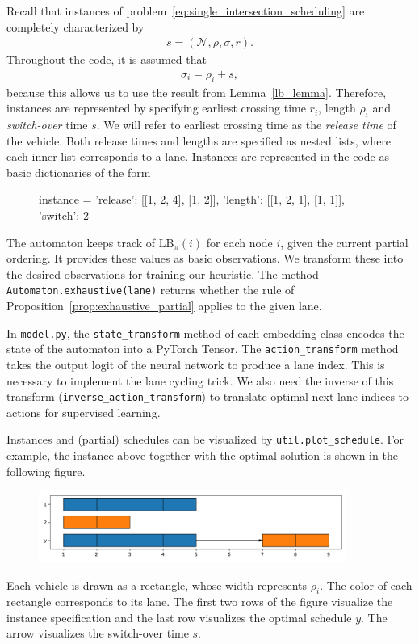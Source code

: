 \documentclass[a4paper]{article}
\theoremstyle{definition}
\theoremstyle{plain}
\begin{document}
\vspace{1em}
Recall that instances of
problem~\eqref{eq:single_intersection_scheduling} are completely characterized
by
\begin{align*}
  s = (\mathcal{N}, \rho, \sigma, r) .
\end{align*}
Throughout the code, it is assumed that
\begin{align*}
  \sigma_{i} = \rho_{i} + s ,
\end{align*}
because this allows us to use the result from Lemma~\ref{lb_lemma}.
Therefore, instances are represented by specifying earliest crossing time
$r_{i}$, length $\rho_{i}$ and \textit{switch-over} time $s$.
We will refer to earliest crossing time as the \textit{release time} of the vehicle.
Both release times and lengths are specified as nested lists, where each inner list corresponds to a lane.
Instances are represented in the code as basic dictionaries of the form
\begin{figure}[H]
\centering
\begin{cminted}
instance = {
    'release': [[1, 2, 4], [1, 2]],
    'length':  [[1, 2, 1], [1, 1]],
    'switch':  2
}
\end{cminted}
\end{figure}

The automaton keeps track of $\text{LB}_{\pi}(i)$ for each node $i$, given the
current partial ordering. It provides these values as basic observations. We
transform these into the desired observations for training our heuristic.
%
The method \texttt{Automaton.exhaustive(lane)} returns whether the rule of
Proposition~\ref{prop:exhaustive_partial} applies to the given lane.

In \texttt{model.py}, the \texttt{state\_transform} method of each embedding
class encodes the state of the automaton into a PyTorch Tensor. The
\texttt{action\_transform} method takes the output logit of the neural network
to produce a lane index. This is necessary to implement the lane cycling trick.
We also need the inverse of this transform (\texttt{inverse\_action\_transform})
to translate optimal next lane indices to actions for supervised learning.

Instances and (partial) schedules can be visualized by \texttt{util.plot\_schedule}.
For example, the instance above together with the optimal solution is shown in
the following figure.
\begin{figure}[H]
\centering
\includegraphics[width=0.9\textwidth]{figures/example_schedule.pdf}
\end{figure}
\noindent
Each vehicle is drawn as a rectangle, whose width represents $\rho_{i}$. The color
of each rectangle corresponds to its lane. The first two rows of the figure
visualize the instance specification and the last row visualizes the optimal
schedule $y$. The arrow visualizes the switch-over time $s$.
\end{document}
